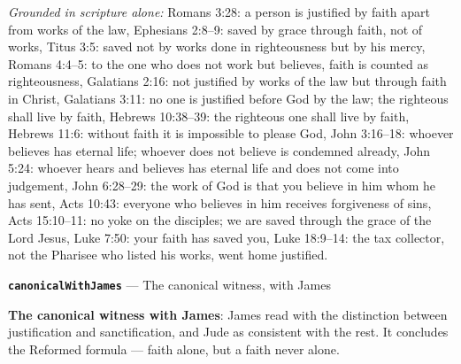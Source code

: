 \documentclass[11pt,paper=\testimonypaper,DIV=13,parskip=false]{scrartcl}
\begin{document}
\emph{Grounded in scripture alone:} Romans 3:28: a person is justified by faith apart from works of the law, Ephesians 2:8–9: saved by grace through faith, not of works, Titus 3:5: saved not by works done in righteousness but by his mercy, Romans 4:4–5: to the one who does not work but believes, faith is counted as righteousness, Galatians 2:16: not justified by works of the law but through faith in Christ, Galatians 3:11: no one is justified before God by the law; the righteous shall live by faith, Hebrews 10:38–39: the righteous one shall live by faith, Hebrews 11:6: without faith it is impossible to please God, John 3:16–18: whoever believes has eternal life; whoever does not believe is condemned already, John 5:24: whoever hears and believes has eternal life and does not come into judgement, John 6:28–29: the work of God is that you believe in him whom he has sent, Acts 10:43: everyone who believes in him receives forgiveness of sins, Acts 15:10–11: no yoke on the disciples; we are saved through the grace of the Lord Jesus, Luke 7:50: your faith has saved you, Luke 18:9–14: the tax collector, not the Pharisee who listed his works, went home justified.
\par\medskip\noindent\textbf{\texttt{canonical\allowbreak{}With\allowbreak{}James}} --- The canonical witness, with James\par\nobreak\noindent
\textbf{The canonical witness with James}: James read with the distinction between justification and sanctification, and Jude as consistent with the rest. It concludes the Reformed formula — faith alone, but a faith never alone.
\end{document}
